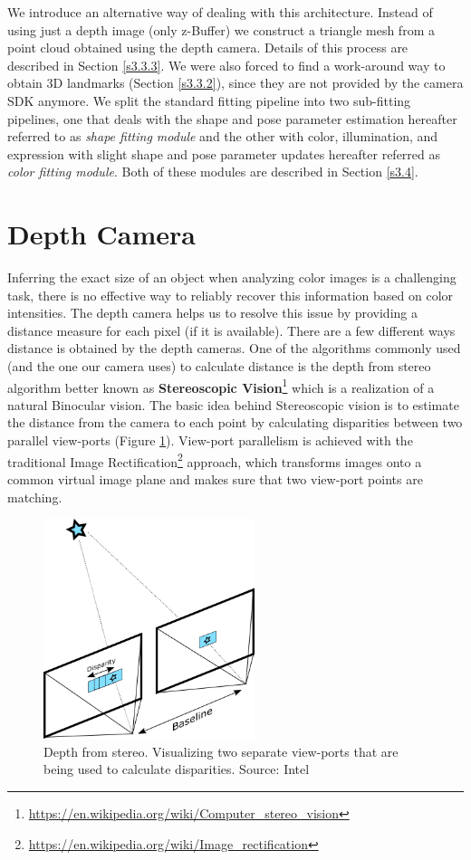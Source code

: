 We introduce an alternative way of dealing with this architecture. Instead of using just a depth image (only z-Buffer) we construct a triangle mesh from a point cloud obtained using the depth camera. Details of this process are described in Section \ref{s3.3.3}. We were also forced to find a work-around way to obtain 3D landmarks (Section \ref{s3.3.2}), since they are not provided by the camera SDK anymore. We split the standard fitting pipeline into two sub-fitting pipelines, one that deals with the shape and pose parameter estimation hereafter referred to as \textit{shape fitting module} and the other with color, illumination, and expression with slight shape and pose parameter updates hereafter referred as \textit{color fitting module}. Both of these modules are described in Section \ref{s3.4}.

\section{Depth Camera}

Inferring the exact size of an object when analyzing color images is a challenging task, there is no effective way to reliably recover this information based on color intensities. The depth camera helps us to resolve this issue by providing a distance measure for each pixel (if it is available). There are a few different ways distance is obtained by the depth cameras. One of the algorithms commonly used (and the one our camera uses) to calculate distance is the depth from stereo algorithm better known as \textbf{Stereoscopic Vision}\footnote{\url{https://en.wikipedia.org/wiki/Computer_stereo_vision}} which is a realization of a natural Binocular vision. The basic idea behind Stereoscopic vision is to estimate the distance from the camera to each point by calculating disparities between two parallel view-ports\cite{serg, DBLP:journals/corr/KeselmanWGB17} (Figure \ref{f2.5}). View-port parallelism is achieved with the traditional Image Rectification\footnote{\url{https://en.wikipedia.org/wiki/Image_rectification}} approach, which transforms images onto a common virtual image plane and makes sure that two view-port points are matching. 

\begin{figure}
    \centering
    \includegraphics[width=0.55\textwidth]{Figures/Pictures/stereo-ssd-1.png}
    \caption{Depth from stereo. Visualizing two separate view-ports that are being used to calculate disparities. Source: Intel}
    \label{f2.5}
\end{figure}
 
